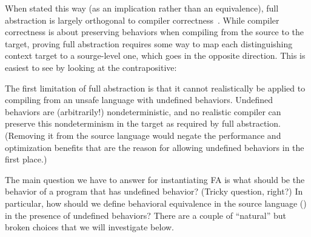 \documentclass[10pt, conference, compsocconf, letterpaper, times]{IEEEtran}
\begin{document}
When stated this way (as an implication rather than an equivalence),
full abstraction is largely orthogonal to compiler
correctness~\cite{leroy09:compcert, KumarMNO14}.
While compiler correctness is about preserving behaviors when
compiling from the source to the target, proving full abstraction
requires some way to map each distinguishing context target to a
sourge-level one, which goes in the opposite direction.
This is easiest to see by looking at the contrapositive:






\label{sec:prob1}

\ifsooner{}\fi

The first limitation of full abstraction is that it cannot realistically be
applied to compiling from an unsafe language with undefined behaviors.
Undefined behaviors are (arbitrarily!) nondeterministic, and no
realistic compiler can preserve this nondeterminism in the target
as required by full abstraction. (Removing it from the source language
would negate the performance and optimization benefits that are the
reason for allowing undefined behaviors in the first place.)





\iffalse
{}



The main question we have to answer for instantiating FA is what
should be the behavior of a program that has undefined behavior?
(Tricky question, right?)
In particular, how should we define behavioral equivalence in the
source language () in the presence of undefined behaviors?
There are a couple of ``natural'' but broken choices that we will
investigate below.
\end{document}
